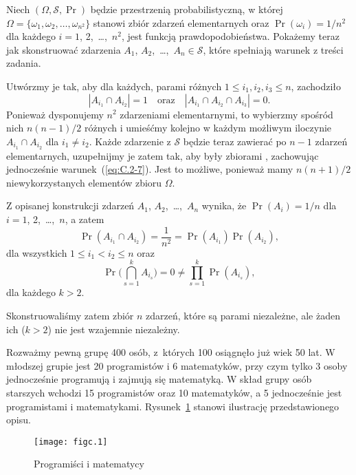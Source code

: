 \exercise{} %
Niech $(\Omega,\mathcal{S},\Pr)$ będzie przestrzenią probabilistyczną, w której $\Omega=\{\omega_1,\omega_2,\dots,\omega_{n^2}\}$ stanowi zbiór zdarzeń elementarnych oraz $\Pr(\omega_i)=1/n^2$ dla każdego $i=1$, 2,~\dots,~$n^2$, jest funkcją prawdopodobieństwa. Pokażemy teraz jak skonstruować zdarzenia $A_1$, $A_2$,~\dots,~$A_n\in\mathcal{S}$, które spełniają warunek z treści zadania.

Utwórzmy je tak, aby dla każdych, parami różnych $1\le i_1,i_2,i_3\le n$, zachodziło
\begin{equation}
	|A_{i_1}\cap A_{i_2}| = 1 \quad\text{oraz}\quad |A_{i_1}\cap A_{i_2}\cap A_{i_3}| = 0. \label{eq:C.2-7}
\end{equation}
Ponieważ dysponujemy $n^2$ zdarzeniami elementarnymi, to wybierzmy spośród nich $n(n-1)/2$ różnych i umieśćmy kolejno w każdym możliwym iloczynie $A_{i_1}\cap A_{i_2}$ dla $i_1\ne i_2$. Każde zdarzenie z $\mathcal{S}$ będzie teraz zawierać po $n-1$ zdarzeń elementarnych, uzupełnijmy je zatem tak, aby były zbiorami , zachowując jednocześnie warunek~(\ref{eq:C.2-7}). Jest to możliwe, ponieważ mamy $n(n+1)/2$ niewykorzystanych elementów zbioru $\Omega$.

Z opisanej konstrukcji zdarzeń $A_1$, $A_2$,~\dots,~$A_n$ wynika, że $\Pr(A_i)=1/n$ dla $i=1$, 2,~\dots,~$n$, a zatem
\[
	\Pr(A_{i_1}\cap A_{i_2}) = \frac{1}{n^2} = \Pr(A_{i_1})\Pr(A_{i_2}),
\]
dla wszystkich $1\le i_1<i_2\le n$ oraz
\[
	\Pr\biggl(\bigcap_{s=1}^kA_{i_s}\biggr) = 0 \ne \prod_{s=1}^k\Pr(A_{i_s}),
\]
dla każdego $k>2$.

Skonstruowaliśmy zatem zbiór $n$ zdarzeń, które są parami niezależne, ale żaden ich  ($k>2$) nie jest wzajemnie niezależny.

\exercise{} %
Rozważmy pewną grupę 400 osób, z~których 100 osiągnęło już wiek 50 lat. W młodszej grupie jest 20 programistów i 6 matematyków, przy czym tylko 3 osoby jednocześnie programują i zajmują się matematyką. W skład grupy osób starszych wchodzi 15 programistów oraz 10 matematyków, a 5 jednocześnie jest programistami i matematykami. Rysunek~\ref{fig:C.2-8} stanowi ilustrację przedstawionego opisu.
\begin{figure}[ht]
	\begin{center}
		\texttt{[image: figc.1]}
	\end{center}
	\caption{Programiści i matematycy} \label{fig:C.2-8}
\end{figure}

